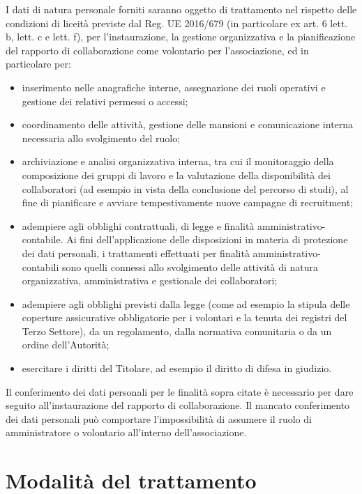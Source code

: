 \documentclass[legal]{polinetwork}
\begin{document}
I dati di natura personale forniti saranno oggetto di trattamento nel rispetto delle condizioni di liceità previste dal Reg. UE 2016/679 (in particolare ex art. 6 lett. b, lett. c e lett. f), per l’instaurazione, la gestione organizzativa e la pianificazione del rapporto di collaborazione come volontario per l’associazione, ed in particolare per:

\begin{itemize}
	\item inserimento nelle anagrafiche interne, assegnazione dei ruoli operativi e gestione dei relativi permessi o accessi;
	\item coordinamento delle attività, gestione delle mansioni e comunicazione interna necessaria allo svolgimento del ruolo;
	\item archiviazione e analisi organizzativa interna, tra cui il monitoraggio della composizione dei gruppi di lavoro e la valutazione della disponibilità dei collaboratori (ad esempio in vista della conclusione del percorso di studi), al fine di pianificare e avviare tempestivamente nuove campagne di recruitment;
	\item adempiere agli obblighi contrattuali, di legge e finalità amministrativo-contabile. Ai fini dell’applicazione delle disposizioni in materia di protezione dei dati personali, i trattamenti effettuati per finalità amministrativo-contabili sono quelli connessi allo svolgimento delle attività di natura organizzativa, amministrativa e gestionale dei collaboratori;
	\item adempiere agli obblighi previsti dalla legge (come ad esempio la stipula delle coperture assicurative obbligatorie per i volontari e la tenuta dei registri del Terzo Settore), da un regolamento, dalla normativa comunitaria o da un ordine dell’Autorità;
	\item esercitare i diritti del Titolare, ad esempio il diritto di difesa in giudizio.
\end{itemize}

Il conferimento dei dati personali per le finalità sopra citate è necessario per dare seguito all’instaurazione del rapporto di collaborazione. Il mancato conferimento dei dati personali può comportare l’impossibilità di assumere il ruolo di amministratore o volontario all'interno dell'associazione.

\section{Modalità del trattamento}
\end{document}
